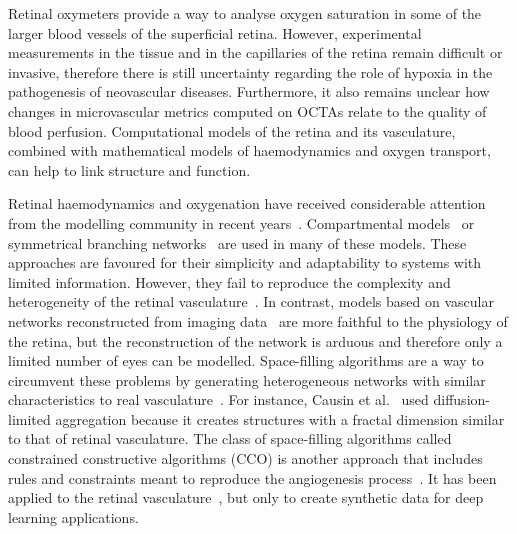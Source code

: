 \documentclass[11pt,]{article}
\begin{document}
Retinal oxymeters provide a way to analyse oxygen saturation in some of the larger blood vessels of the superficial retina.
However, experimental measurements in the tissue and in the capillaries of the retina remain difficult or invasive, therefore there is still uncertainty regarding the role of hypoxia in the pathogenesis of neovascular diseases.
Furthermore, it also remains unclear
how changes in microvascular metrics computed on OCTAs relate to the
quality of blood perfusion. Computational models of the retina and its
vasculature, combined with mathematical models of haemodynamics and
oxygen transport, can help to link structure and function.

Retinal haemodynamics and oxygenation have received considerable
attention from the modelling community in recent
years~\cite{Arciero2008,Bernabeu2014,Causin2016,Chiaravalli2022,DoblhoffDier2014,
  Fry2020,Guidoboni2014,Hernandez2023,Takahashi2009,Zhu2019,Yu2019}.
Compartmental models~\cite{Arciero2008,Guidoboni2014,Chiaravalli2022}
or symmetrical branching
networks~\cite{Chiaravalli2022,Takahashi2009,Zhu2019} are used in many
of these models. These approaches are favoured for their simplicity
and adaptability to systems with limited information. However, they
fail to reproduce the complexity and heterogeneity of the retinal
vasculature~\cite{Yu2019}. In contrast, models based on vascular
networks reconstructed from imaging data~\cite{Bernabeu2014,Fry2020}
are more faithful to the physiology of the retina, but the
reconstruction of the network is arduous and therefore only a limited
number of eyes can be modelled. Space-filling algorithms are a way to
circumvent these problems by generating heterogeneous networks with
similar characteristics to real
vasculature~\cite{Causin2016,Linninger2013,Talou2021}. For instance,
Causin et al.~\cite{Causin2016} used diffusion-limited aggregation because it creates structures with a fractal dimension similar to that of retinal vasculature.
The class of space-filling algorithms called constrained constructive algorithms
(CCO) is another approach that includes rules and constraints meant to
reproduce the angiogenesis process~\cite{Linninger2013,Talou2021}. It
has been applied to the retinal
vasculature~\cite{Brown2023,LoCastro2020}, but only to create
synthetic data for deep learning applications.
\end{document}
